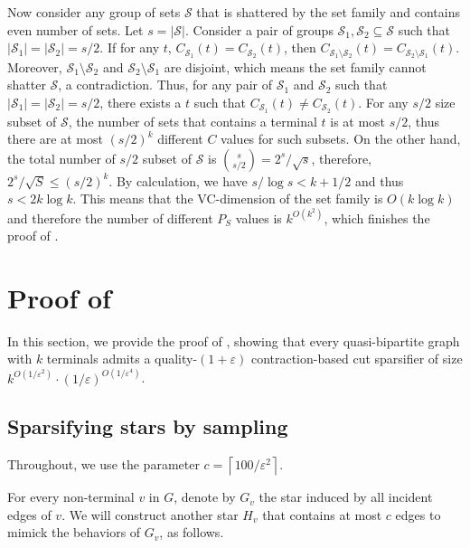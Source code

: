 \documentclass[11pt]{article}
\theoremstyle{definition}
\newcommand{\eps}{{\varepsilon}}
\def\ceil#1{\left\lceil #1 \right\rceil}
\def\card#1{\left| #1 \right|}
\newcounter{note}
\begin{document}
Now consider any group of sets $\mathcal{S}$ that is shattered by the set family and contains even number of sets. Let $s=\card{\mathcal{S}}$. Consider a pair of groups $\mathcal{S}_1,\mathcal{S}_2 \subseteq \mathcal{S}$ such that $\card{\mathcal{S}_1} = \card{\mathcal{S}_2} = s/2$. If for any $t$, $C_{\mathcal{S}_1}(t) = C_{\mathcal{S}_2}(t)$, then $C_{\mathcal{S}_1 \setminus \mathcal{S}_2}(t) = C_{\mathcal{S}_2 \setminus \mathcal{S}_1}(t)$. Moreover, $\mathcal{S}_1 \setminus \mathcal{S}_2$ and $\mathcal{S}_2 \setminus \mathcal{S}_1$ are disjoint, which means the set family cannot shatter $\mathcal{S}$, a contradiction. Thus, for any pair of $\mathcal{S}_1$ and $\mathcal{S}_2$ such that $\card{\mathcal{S}_1} = \card{\mathcal{S}_2} = s/2$, there exists a $t$ such that $C_{\mathcal{S}_1}(t) \neq C_{\mathcal{S}_2}(t)$. For any $s/2$ size subset of $\mathcal{S}$, the number of sets that contains a terminal $t$ is at most $s/2$, thus there are at most $(s/2)^k$ different $C$ values for such subsets. On the other hand, the total number of $s/2$ subset of $\mathcal{S}$ is $\binom{s}{s/2} = 2^s/\sqrt{s}$, therefore, $2^s/\sqrt{S} \le (s/2)^k$. By calculation, we have $s/\log s < k + 1/2$ and thus $s < 2 k \log k$. This means that the VC-dimension of the set family is $O(k \log k)$ and therefore the number of different $P_S$ values is $k^{O(k^2)}$, which finishes the proof of .
\fi 
\section{Proof of }
\label{sec: quasi_apx}

In this section, we provide the proof of , showing that every quasi-bipartite graph with $k$ terminals admits a quality-$(1+\eps)$ contraction-based cut sparsifier of size $k^{O(1/\eps^2)}\cdot (1/\eps)^{O(1/\eps^4)}$. 






\subsection{Sparsifying stars by sampling}
\label{subsec: sparsified star}

Throughout, we use the parameter $c = \ceil{100/\eps^2}$. 

For every non-terminal $v$ in $G$, denote by $G_v$ the star induced by all incident edges of $v$. We will construct another star $H_v$ that contains at most $c$ edges to mimick the behaviors of $G_v$, as follows.
\end{document}
